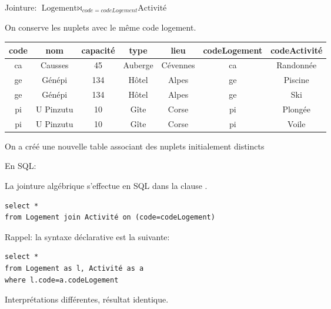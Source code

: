 \begin{frame}[fragile]{Jointure: $\text{Logement} \Join_{code=codeLogement} \text{Activité}$}

On conserve les nuplets avec le \alert{même} code logement.

\vfill
\begin{tabular}{c|c|c|c|c|c|c}
\textbf{code} & \textbf{nom} & \textbf{capacité} & \textbf{type} & \textbf{lieu} & \textbf{codeLogement} & \textbf{codeActivité}\\ \hline 
ca & Causses & 45 & Auberge & Cévennes & ca & Randonnée\\ \hline 
ge & Génépi & 134 & Hôtel & Alpes & ge & Piscine\\ \hline 
ge & Génépi & 134 & Hôtel & Alpes & ge & Ski\\ \hline 
pi & U Pinzutu & 10 & Gîte & Corse & pi & Plongée\\ \hline 
pi & U Pinzutu & 10 & Gîte & Corse & pi & Voile\\ \hline 
\end{tabular}

\vfill

\begin{blocgauche}
On a créé une nouvelle table associant des nuplets initialement distincts
\end{blocgauche}
\end{frame}


\begin{frame}[fragile]{En SQL: }

La \alert{jointure algébrique} s'effectue en SQL dans la clause .

\begin{verbatim}
select *
from Logement join Activité on (code=codeLogement)
\end{verbatim}

\vfill

Rappel: la syntaxe \alert{déclarative} est la suivante:

\begin{verbatim}
select *
from Logement as l, Activité as a
where l.code=a.codeLogement
\end{verbatim}

\begin{blocgauche}
Interprétations différentes, résultat identique.
\end{blocgauche}
\end{frame}


